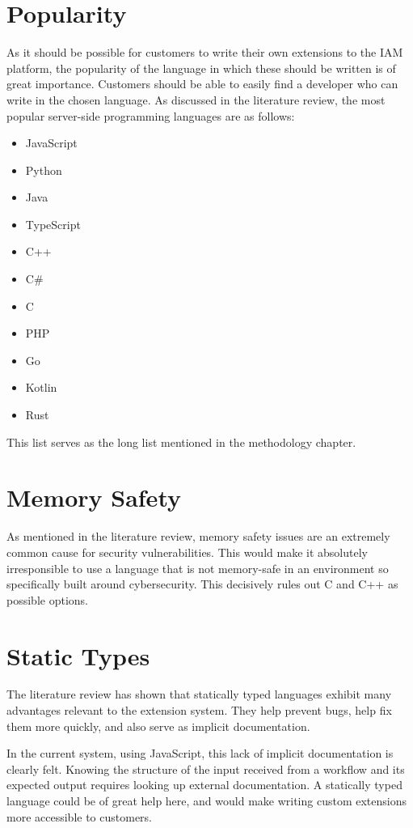 \section{Popularity}
As it should be possible for customers to write their own extensions to the IAM platform, the popularity of the language in which these should be written is of great importance. Customers should be able to easily find a developer who can write in the chosen language. As discussed in the literature review, the most popular server-side programming languages are as follows:
\begin{itemize}
    \item JavaScript
    \item Python
    \item Java
    \item TypeScript
    \item C++
    \item C\#
    \item C
    \item PHP
    \item Go
    \item Kotlin
    \item Rust
\end{itemize}

This list serves as the long list mentioned in the methodology chapter.

\section{Memory Safety}
As mentioned in the literature review, memory safety issues are an extremely common cause for security vulnerabilities. This would make it absolutely irresponsible to use a language that is not memory-safe in an environment so specifically built around cybersecurity. This decisively rules out C and C++ as possible options.

\section{Static Types}
The literature review has shown that statically typed languages exhibit many advantages relevant to the extension system. They help prevent bugs, help fix them more quickly, and also serve as implicit documentation.

In the current system, using JavaScript, this lack of implicit documentation is clearly felt. Knowing the structure of the input received from a workflow and its expected output requires looking up external documentation. A statically typed language could be of great help here, and would make writing custom extensions more accessible to customers.

